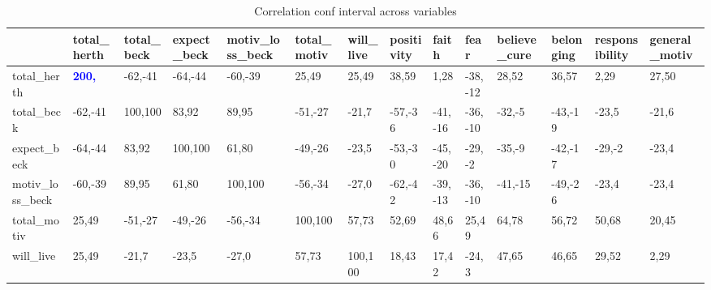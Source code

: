 \begin{table}[H]
\tiny
 \caption{Correlation conf interval across variables}
 \label{correlation_conf_interval_across_variables}
 \centering
 \begin{adjustbox}{angle=270}
 \begin{tabular} {|l|l|l|l|l|l|l|l|l|l|l|l|l|l|}
 \hline
  &  total\_herth & total\_beck & expect\_beck & motiv\_loss\_beck & total\_motiv & will\_live & positivity & faith & fear & believe\_cure & belonging & responsibility & general\_motiv \\
 \hline
 total\_herth & {\bf \textcolor{blue}{200,\;\;\;\;200}} & {\color{red}-62,-41} & {\color{red}-64,-44} & {\color{red}-60,-39} & {\color{green}25,49} & {\color{green}25,49} & {\color{green}38,59} & {\color{green}1,28} & {\color{red}-38,-12} & {\color{green}28,52} & {\color{green}36,57} & {\color{green}2,29} & {\color{green}27,50} \\ 
 \hline
 total\_beck & {\color{red}-62,-41} & {\color{green}100,100} & {\color{green}83,92} & {\color{green}89,95} & {\color{red}-51,-27} & -21,7 & {\color{red}-57,-36} & {\color{red}-41,-16} & {\color{red}-36,-10} & {\color{red}-32,-5} & {\color{red}-43,-19} & -23,5 & -21,6 \\
 \hline
 expect\_beck & {\color{red}-64,-44} & {\color{green}83,92} & {\color{green}100,100} & {\color{green}61,80} & {\color{red}-49,-26} & -23,5 & {\color{red}-53,-30} & {\color{red}-45,-20} & {\color{red}-29,-2} & {\color{red}-35,-9} & {\color{red}-42,-17} & {\color{red}-29,-2} & -23,4 \\
 \hline
 motiv\_loss\_beck & {\color{red}-60,-39} & {\color{green}89,95} & {\color{green}61,80} & {\color{green}100,100} & {\color{red}-56,-34} & -27,0 & {\color{red}-62,-42} & {\color{red}-39,-13} & {\color{red}-36,-10} & {\color{red}-41,-15} & {\color{red}-49,-26} & -23,4 & -23,4 \\
 \hline
 total\_motiv & {\color{green}25,49} & {\color{red}-51,-27} & {\color{red}-49,-26} & {\color{red}-56,-34} & {\color{green}100,100} & {\color{green}57,73} & {\color{green}52,69} & {\color{green}48,66} & {\color{green}25,49} & {\color{green}64,78} & {\color{green}56,72} & {\color{green}50,68} & {\color{green}20,45} \\
 \hline
 will\_live & {\color{green}25,49} & -21,7 & -23,5 & -27,0 & {\color{green}57,73} & {\color{green}100,100} & {\color{green}18,43} & {\color{green}17,42} & -24,3 & {\color{green}47,65} & {\color{green}46,65} & {\color{green}29,52} & {\color{green}2,29} \\

\end{tabular}
\end{adjustbox}
\end{table}
